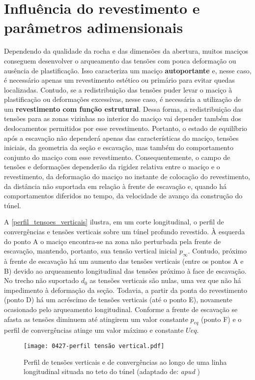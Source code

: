 \section{Influência do revestimento e parâmetros adimensionais}

Dependendo da qualidade da rocha e das dimensões da abertura, muitos maciços conseguem desenvolver o arqueamento das tensões com pouca deformação ou ausência de plastificação. Isso caracteriza um maciço \textbf{autoportante} e, nesse caso, é necessário apenas um revestimento estético ou primário para evitar quedas localizadas. Contudo, se a redistribuição das tensões puder levar o maciço à plastificação ou deformações excessivas, nesse caso, é necessária a utilização de um \textbf{revestimento com função estrutural}. Dessa forma, a redistribuição das tensões para as zonas vizinhas no interior do maciço vai depender também dos deslocamentos permitidos por esse revestimento. Portanto, o estado de equilíbrio após a escavação não dependerá apenas das características do maciço, tensões iniciais, da geometria da seção e escavação, mas também do comportamento conjunto do maciço com esse revestimento. Consequentemente, o campo de tensões e deformações dependerão da rigidez relativa entre o maciço e o revestimento, da deformação do maciço no instante de colocação do revestimento, da distância não suportada em relação à frente de escavação e, quando há comportamentos diferidos no tempo, da velocidade de avanço da construção do túnel.

A \autoref{perfil_tensoes_verticais} ilustra, em um corte longitudinal, o perfil de convergências e tensões verticais sobre um túnel profundo revestido. À esquerda do ponto A o maciço encontra-se na zona não perturbada pela frente de escavação, mantendo, portanto, sua tensão vertical inicial $p_{\infty}$. Contudo, próximo à frente de escavação há um aumento das tensões verticais (entre os pontos A e B) devido ao arqueamento longitudinal das tensões próximo à face de escavação. No trecho não suportado $d_0$ as tensões verticais são nulas, uma vez que não há impedimento à deformação da seção. Todavia, a partir da ponta do revestimento (ponto D) há um acréscimo de tensões verticais (até o ponto E), novamente ocasionado pelo arqueamento longitudinal. Conforme a frente de escavação se afasta as tensões diminuem até atingirem um valor constante $p_{eq}$ (ponto F) e o perfil de convergências atinge um valor máximo e constante $Ueq$.

\begin{figure}[H]
	\begin{center}
		\texttt{[image: 0427-perfil tensão vertical.pdf]}
	\end{center}
	\caption{\label{perfil_tensoes_verticais}Perfil de tensões verticais e de convergências ao longo de uma linha longitudinal situada no teto do túnel (adaptado de:  \textit{apud} )}
\end{figure}

